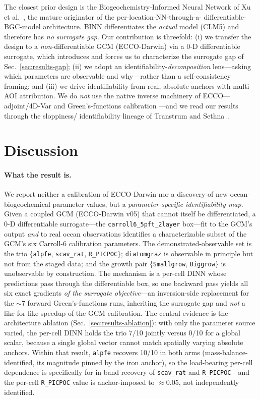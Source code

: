 \documentclass[11pt]{article}
\begin{document}
The closest prior design is the Biogeochemistry-Informed Neural Network of
Xu et al.~\cite{xu2025binn}, the mature originator of the per-location-NN-through-a-%
differentiable-BGC-model architecture. BINN differentiates the \emph{actual}
model (CLM5) and therefore has \emph{no surrogate gap}. Our contribution is
threefold: (i) we transfer the design to a \emph{non}-differentiable GCM
(ECCO-Darwin) via a 0-D differentiable surrogate, which introduces and forces us
to characterize the surrogate gap of Sec.~\ref{sec:results-gap}; (ii) we adopt an
identifiability-\emph{decomposition} lens---asking which parameters are observable
and why---rather than a self-consistency framing; and (iii) we drive
identifiability from real, absolute anchors with multi-AOI attribution. We do
\emph{not} use the native inverse machinery of ECCO---adjoint/4D-Var
\cite{heimbach2015,menemenlis2005} and Green's-functions calibration
\cite{carroll2022}---and we read our results through the sloppiness/%
identifiability lineage of Transtrum and Sethna~\cite{transtrum2012}.

\section{Discussion}
\label{sec:discussion}

\paragraph{What the result is.}
We report neither a calibration of ECCO-Darwin nor a discovery of new
ocean-biogeochemical parameter values, but a \emph{parameter-specific
identifiability map}. Given a coupled GCM (ECCO-Darwin v05) that cannot itself be
differentiated, a 0-D differentiable surrogate---the
\texttt{carroll6\_5pft\_2layer} box---fit to the GCM's output \emph{and} to real
ocean observations identifies a characterizable subset of the GCM's six Carroll-6
calibration parameters. The demonstrated-observable set is the trio
$\{$\texttt{alpfe}, \texttt{scav\_rat}, \texttt{R\_PICPOC}$\}$;
\texttt{diatomgraz} is observable in principle but not from the staged data; and
the growth pair $\{$\texttt{Smallgrow}, \texttt{Biggrow}$\}$ is unobservable by
construction. The mechanism is a per-cell DINN whose predictions pass through the
differentiable box, so one backward pass yields all six exact gradients
\emph{of the surrogate objective}---an inversion-side replacement for the $\sim$7
forward Green's-functions runs, inheriting the surrogate gap and \emph{not} a
like-for-like speedup of the GCM calibration. The central evidence is the
architecture ablation (Sec.~\ref{sec:results-ablation}): with only the parameter
source varied, the per-cell DINN holds the trio 7/10 jointly versus 0/10 for a
global scalar, because a single global vector cannot match spatially varying
absolute anchors. Within that result, \texttt{alpfe} recovers 10/10 in both arms
(mass-balance-identified, its magnitude pinned by the iron anchor), so the
load-bearing per-cell dependence is specifically for in-band recovery of
\texttt{scav\_rat} and \texttt{R\_PICPOC}---and the per-cell \texttt{R\_PICPOC}
value is anchor-imposed to $\approx0.05$, not independently identified.
\end{document}
